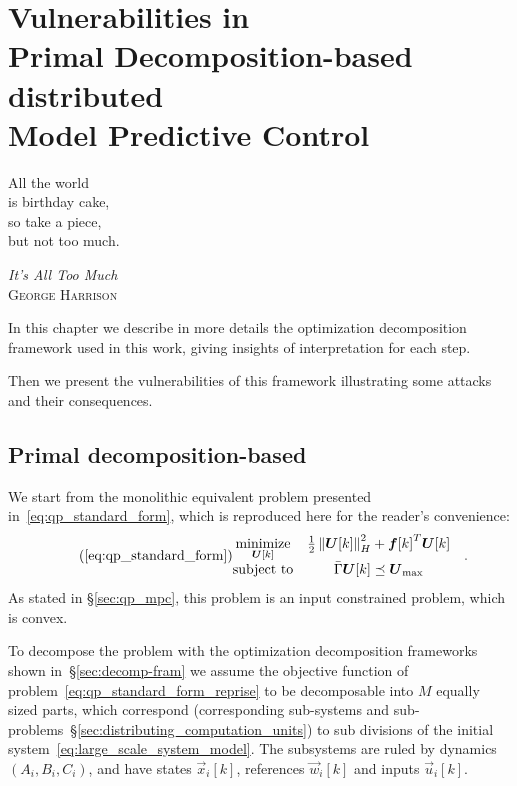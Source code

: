\documentclass[../main.tex]{subfiles}
\begin{document}
\chapter[Vulnerabilities in Primal Decomposition-based dMPC]{Vulnerabilities in \\Primal Decomposition-based \\distributed \\Model Predictive Control}\label{sec:primal_decomposition}
\epigraph{\centering All the world\\ is birthday cake,\\ so take a piece, \\but not too much.}
{\textit{It's All Too Much}\\\textsc{George Harrison}}

In this chapter we describe in more details the optimization decomposition framework used in this work, giving insights of interpretation for each step.

Then we present the vulnerabilities of this framework illustrating some attacks and their consequences.

\minitoc

\section{Primal decomposition-based \dmpc{}}\label{sec:decomposition_PD}

We start from the monolithic \mpc{} equivalent problem presented in~\eqref{eq:qp_standard_form}, which is reproduced here for the reader's convenience:
\begin{equation}
  \label{eq:qp_standard_form_reprise}
  \tag{\ref*{eq:qp_standard_form}}
  \begin{aligned}
    \begin{matrix}
      \minimize\limits_{\vec{U}[k]} &
      \frac{1}{2}\norm{\vec{U}[k]}^{2}_{H} + {\vec{f}[k]}^{T}\vec{U}[k] &\\
      \mathrm{subject~ to} &
\bar{\Gamma}\vec{U}[k]\preceq {\vec{U}}_{\text{max}}
    \end{matrix}
  \end{aligned}.
\end{equation}
As stated in \S\ref{sec:qp_mpc}, this problem is an input constrained \qp{} problem, which is convex.

To decompose the problem with the optimization decomposition frameworks shown in~\S\ref{sec:decomp-fram} we assume the objective function of problem~\eqref{eq:qp_standard_form_reprise} to be decomposable into $M$ equally sized parts, which correspond (corresponding sub-systems and sub-problems~\S\ref{sec:distributing_computation_units}) to sub divisions of the initial system~\eqref{eq:large_scale_system_model}.
The subsystems are ruled by dynamics $(A_{i},B_{i},C_{i})$, and have states $\vec{x}_{i}[k]$, references $\vec{w}_{i}[k]$ and inputs $\vec{u}_{i}[k]$.
\end{document}
